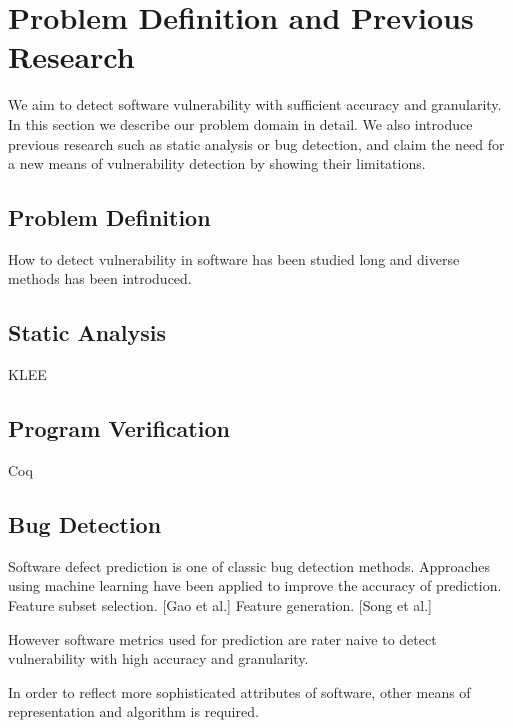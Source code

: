 \section{Problem Definition and Previous Research}
We aim to detect software vulnerability with sufficient accuracy and granularity.
In this section we describe our problem domain in detail.
We also introduce previous research such as static analysis or bug detection,
and claim the need for a new means of vulnerability detection by showing their limitations.


\subsection{Problem Definition}

How to detect vulnerability in software has been studied long and diverse methods has been introduced.

\subsection{Static Analysis}

KLEE

\subsection{Program Verification}

Coq

\subsection{Bug Detection}

Software defect prediction is one of classic bug detection methods.
Approaches using machine learning have been applied to improve the accuracy of prediction.
Feature subset selection. [Gao et al.]
Feature generation. [Song et al.]


However software metrics used for prediction are rater naive to detect vulnerability
with high accuracy and granularity.

In order to reflect more sophisticated attributes of software, other means of representation and algorithm is required.

